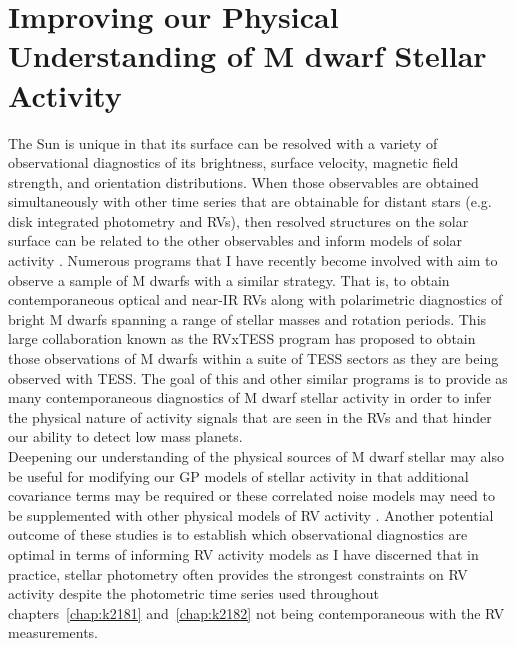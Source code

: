 \section{Improving our Physical Understanding of M dwarf Stellar Activity}
The Sun is unique in that its surface can be resolved with a variety of
observational diagnostics of its brightness, surface velocity, magnetic field strength,
and orientation distributions. When those observables are obtained
simultaneously with other time series that are obtainable for distant stars
(e.g. disk integrated photometry and RVs), then resolved structures on the solar
surface can be related to the other observables and inform models of solar
activity \citep{dumusque15,haywood16}. Numerous programs that I have recently
become involved with aim to observe a sample of M dwarfs with a similar
strategy. That is, to obtain contemporaneous optical and near-IR RVs along with
polarimetric diagnostics of bright M dwarfs spanning a range of stellar masses
and rotation periods. This large collaboration known as the RVxTESS program
has proposed to obtain those observations of M dwarfs within a suite of TESS
sectors as they are being observed with TESS. The goal of this and other
similar programs is to provide as many contemporaneous diagnostics of M dwarf
stellar activity in order to infer the physical nature of activity signals that
are seen in the RVs and that hinder our ability to detect low mass planets. \\

Deepening our understanding of the physical sources of M dwarf stellar may also
be useful for modifying our GP models of stellar activity in that additional
covariance terms may be required or these correlated noise models may need to
be supplemented with other physical models of RV activity
\citep[e.g.][]{aigrain12,haywood14}. Another potential
outcome of these studies is to establish which observational diagnostics
are optimal in terms of informing RV activity models as I have discerned that
in practice, stellar photometry often provides the strongest constraints on RV
activity despite the photometric time series used throughout
chapters~\ref{chap:k2181} and~\ref{chap:k2182} not being contemporaneous with
the RV measurements.


